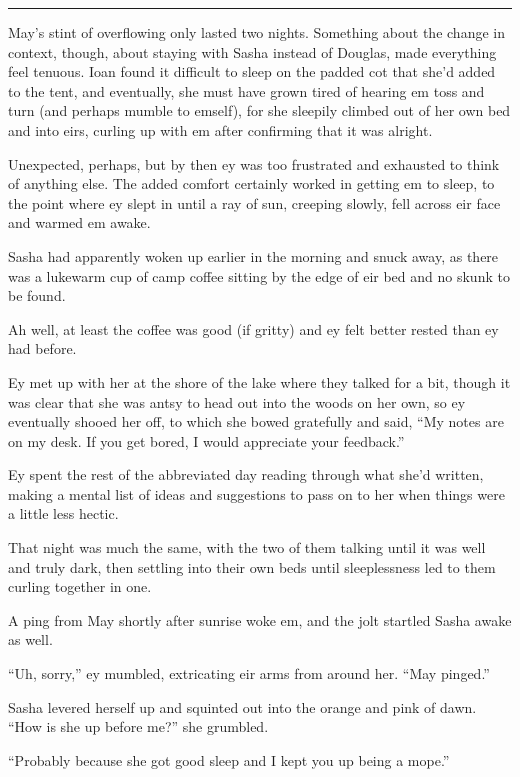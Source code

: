 \begin{center}\rule{0.5\linewidth}{0.5pt}\end{center}

May's stint of overflowing only lasted two nights. Something about the change in context, though, about staying with Sasha instead of Douglas, made everything feel tenuous. Ioan found it difficult to sleep on the padded cot that she'd added to the tent, and eventually, she must have grown tired of hearing em toss and turn (and perhaps mumble to emself), for she sleepily climbed out of her own bed and into eirs, curling up with em after confirming that it was alright.

Unexpected, perhaps, but by then ey was too frustrated and exhausted to think of anything else. The added comfort certainly worked in getting em to sleep, to the point where ey slept in until a ray of sun, creeping slowly, fell across eir face and warmed em awake.

Sasha had apparently woken up earlier in the morning and snuck away, as there was a lukewarm cup of camp coffee sitting by the edge of eir bed and no skunk to be found.

Ah well, at least the coffee was good (if gritty) and ey felt better rested than ey had before.

Ey met up with her at the shore of the lake where they talked for a bit, though it was clear that she was antsy to head out into the woods on her own, so ey eventually shooed her off, to which she bowed gratefully and said, ``My notes are on my desk. If you get bored, I would appreciate your feedback.''

Ey spent the rest of the abbreviated day reading through what she'd written, making a mental list of ideas and suggestions to pass on to her when things were a little less hectic.

That night was much the same, with the two of them talking until it was well and truly dark, then settling into their own beds until sleeplessness led to them curling together in one.

A ping from May shortly after sunrise woke em, and the jolt startled Sasha awake as well.

``Uh, sorry,'' ey mumbled, extricating eir arms from around her. ``May pinged.''

Sasha levered herself up and squinted out into the orange and pink of dawn. ``How is she up before me?'' she grumbled.

``Probably because she got good sleep and I kept you up being a mope.''

